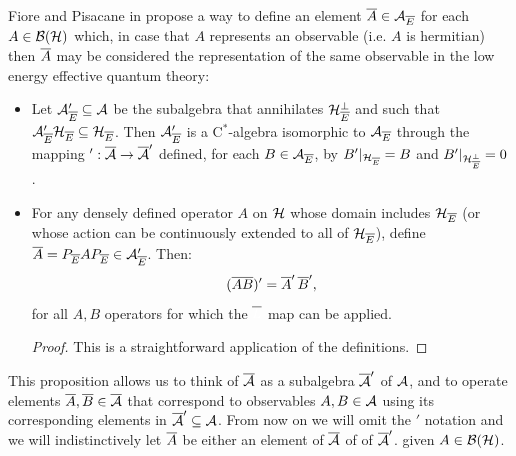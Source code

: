 Fiore and Pisacane in \cite{Fiore2018} propose a way to define an element $\overline{A} \in \mathcal A_{\overline{E}}$ for each $A \in \mathcal B(\mathcal H)$ which, in case that $A$ represents an observable (i.e. $A$ is hermitian) then $\overline{A}$ may be considered the representation of the same observable in the low energy effective quantum theory:
\begin{proposition}\label{propositionCutACutObservableDefinitionMultiplication}
        \hfill
        \begin{itemize}
            
            \item Let $\mathcal A_{\overline{E}}' \subseteq \mathcal A$ be the subalgebra that annihilates $\mathcal H_{\overline{E}}^\perp$ and such that $\mathcal A_{\overline{E}}' \mathcal H_{\overline{E}} \subseteq \mathcal H_{\overline{E}}$. Then $\mathcal A_{\overline{E}}'$ is a C$^*$-algebra isomorphic to $\mathcal A_{\overline{E}}$ through the mapping $': \overline{\mathcal A} \to \overline{\mathcal A}'$ defined, for each $B \in \mathcal A_{\overline{E}}$, by $B'|_{\mathcal H_{\overline{E}}} = B$ and $B'|_{\mathcal H_{\overline{E}}^\perp} = 0$.
            
            \item For any densely defined operator $A$ on $\mathcal H$ whose domain includes $\mathcal H_{\overline{E}}$ (or whose action can be continuously extended to all of $\mathcal H_{\overline{E}}$), define $\overline{A} = P_{\overline{E}} A P_{\overline{E}} \in \mathcal A_{\overline{E}}'$. Then:
            \begin{equation}
                (\overline{A} \overline{B})' = \overline{A}'\, \overline{B}',
            \end{equation}
            for all $A, B$ operators for which the $\cut{{\color{white}L}}$ map can be applied.
        \begin{proof}
        This is a straightforward application of the definitions.
        \end{proof}
        \end{itemize}
        \end{proposition}
        \begin{notation}\label{notationCutOverline}
        This proposition allows us to think of $\overline{\mathcal A}$ as a subalgebra $\overline{\mathcal A}'$ of $\mathcal A$, and to operate elements $\overline{A}, \overline{B} \in \overline{\mathcal A}$ that correspond to observables $A, B \in \mathcal A$ using its corresponding elements in $\overline{\mathcal A}' \subseteq \mathcal A$. From now on we will omit the $'$ notation and we will indistinctively let $\overline{A}$ be either an element of $\overline{\mathcal A}$ of of $\overline{\mathcal A}'$. given $A \in \mathcal B(\mathcal H)$.
        \end{notation}
         
